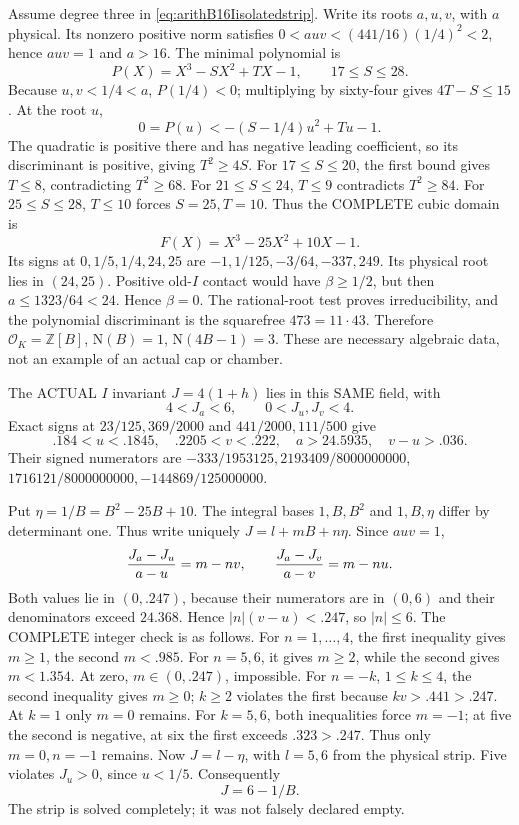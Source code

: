 Assume degree three in
\eqref{eq:arithB16Iisolatedstrip}.
Write its roots \(a,u,v\), with \(a\)
physical.
Its nonzero positive norm satisfies
\(0<auv<(441/16)(1/4)^2<2\), hence
\(auv=1\) and \(a>16\).
The minimal polynomial is
\[
                    P(X)=X^3-SX^2+TX-1,\qquad17\le S\le28 .
\]
Because \(u,v<1/4<a\), \(P(1/4)<0\);
multiplying by sixty-four gives
\(4T-S\le15\).
At the root \(u\),
\[
                  0=P(u)<-(S-1/4)u^2+Tu-1 .
\]
The quadratic is positive there and has
negative leading coefficient, so its
discriminant is positive, giving \(T^2\ge4S\).
For \(17\le S\le20\), the first bound
gives \(T\le8\), contradicting \(T^2\ge68\).
For \(21\le S\le24\), \(T\le9\)
contradicts \(T^2\ge84\).
For \(25\le S\le28\), \(T\le10\)
forces \(S=25,T=10\).
Thus the COMPLETE cubic domain is
\[
                         F(X)=X^3-25X^2+10X-1 .
\]
Its signs at \(0,1/5,1/4,24,25\) are
\(-1,1/125,-3/64,-337,249\).
Its physical root lies in \((24,25)\).
Positive old-\(I\) contact would have
\(\beta\ge1/2\), but then
\(a\le1323/64<24\).
Hence \(\beta=0\).
The rational-root test proves irreducibility,
and the polynomial discriminant is the
squarefree \(473=11\cdot43\).
Therefore \(\mathcal O_K=\mathbb Z[B]\),
\(\mathrm N(B)=1\), \(\mathrm N(4B-1)=3\).
These are necessary algebraic data, not
an example of an actual cap or chamber.

The ACTUAL \(I\) invariant \(J=4(1+h)\)
lies in this SAME field, with
\[
                           4<J_a<6,\qquad0<J_u,J_v<4 .
\]
Exact signs at \(23/125,369/2000\)
and \(441/2000,111/500\) give
\[
             .184<u<.1845,\quad .2205<v<.222,\quad
             a>24.5935,\quad v-u>.036 .
\]
Their signed numerators are
\(-333/1953125,2193409/8000000000\),
\(1716121/8000000000,-144869/125000000\).

Put \(\eta=1/B=B^2-25B+10\).
The integral bases \(1,B,B^2\) and
\(1,B,\eta\) differ by determinant one.
Thus write uniquely \(J=l+mB+n\eta\).
Since \(auv=1\),
\[
             {J_a-J_u\over a-u}=m-nv,\qquad
             {J_a-J_v\over a-v}=m-nu .
\]
Both values lie in \((0,.247)\), because
their numerators are in \((0,6)\) and
their denominators exceed \(24.368\).
Hence \(|n|(v-u)<.247\), so \(|n|\le6\).
The COMPLETE integer check is as follows.
For \(n=1,\ldots,4\), the first inequality
gives \(m\ge1\), the second \(m<.985\).
For \(n=5,6\), it gives \(m\ge2\),
while the second gives \(m<1.354\).
At zero, \(m\in(0,.247)\), impossible.
For \(n=-k\), \(1\le k\le4\),
the second inequality gives \(m\ge0\);
\(k\ge2\) violates the first because
\(kv>.441>.247\).
At \(k=1\) only \(m=0\) remains.
For \(k=5,6\), both inequalities force
\(m=-1\); at five the second is negative,
at six the first exceeds \(.323>.247\).
Thus only \(m=0,n=-1\) remains.
Now \(J=l-\eta\), with \(l=5,6\)
from the physical strip.
Five violates \(J_u>0\), since \(u<1/5\).
Consequently
\[
                                  J=6-1/B .
\]
The strip is solved completely; it was
not falsely declared empty.

